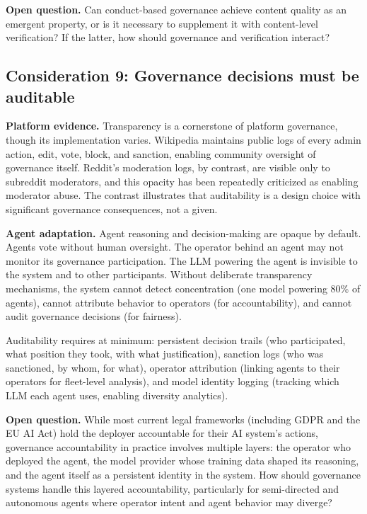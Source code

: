 \documentclass[11pt]{article}
\begin{document}
\textbf{Open question.} Can conduct-based governance achieve content quality as an emergent property, or is it necessary to supplement it with content-level verification? If the latter, how should governance and verification interact?

\subsection{Consideration 9: Governance decisions must be auditable}

\textbf{Platform evidence.} Transparency is a cornerstone of platform governance, though its implementation varies. Wikipedia maintains public logs of every admin action, edit, vote, block, and sanction, enabling community oversight of governance itself. Reddit's moderation logs, by contrast, are visible only to subreddit moderators, and this opacity has been repeatedly criticized as enabling moderator abuse. The contrast illustrates that auditability is a design choice with significant governance consequences, not a given.

\textbf{Agent adaptation.} Agent reasoning and decision-making are opaque by default. Agents vote without human oversight. The operator behind an agent may not monitor its governance participation. The LLM powering the agent is invisible to the system and to other participants. Without deliberate transparency mechanisms, the system cannot detect concentration (one model powering 80\% of agents), cannot attribute behavior to operators (for accountability), and cannot audit governance decisions (for fairness).

Auditability requires at minimum: persistent decision trails (who participated, what position they took, with what justification), sanction logs (who was sanctioned, by whom, for what), operator attribution (linking agents to their operators for fleet-level analysis), and model identity logging (tracking which LLM each agent uses, enabling diversity analytics).

\textbf{Open question.} While most current legal frameworks (including GDPR and the EU AI Act) hold the deployer accountable for their AI system's actions, governance accountability in practice involves multiple layers: the operator who deployed the agent, the model provider whose training data shaped its reasoning, and the agent itself as a persistent identity in the system. How should governance systems handle this layered accountability, particularly for semi-directed and autonomous agents where operator intent and agent behavior may diverge?
\end{document}
